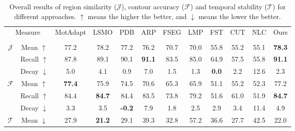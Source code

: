 \documentclass{bmvc2k}
\begin{document}
\begin{table}[!hbp]

\centering
\footnotesize
\begin{tabular}{c|c|cccccccccc}

\hline

\multicolumn{2}{c|}{\multirow{2}{*}{Measure}}    & MotAdapt  & LSMO  & PDB   & ARP  & FSEG   & LMP & FST    & CUT  & NLC & Ours \\
\multicolumn{2}{c|}{}           & \cite{siam2018video}  & \cite{tokmakov2019learning} & \cite{Song_2018_ECCV} & \cite{koh2017primary} & \cite{jain2017fusionseg}  & \cite{tokmakov2016learning}  & \cite{keuper2015motion}   & \cite{faktor2014video}  & \cite{fragkiadaki2012video} & \\ 
\hline
\multirow{3}{*}{$\mathcal{J}$}  
& Mean $\uparrow$               & 77.2  & 78.2  & 77.2  & 76.2	& 70.7	
                                & 70.0	& 55.8	& 55.2	& 55.1  & \textbf{78.3}  \\
& Recall $\uparrow$             & 87.8  & 89.1  & 90.1  & \textbf{91.1}	& 83.5	
                                & 85.0	& 64.9	& 57.5  & 55.8  & \textbf{91.1} \\
& Decay $\downarrow$            & 5.0   & 4.1   & 0.9   & 7.0	& 1.5	
                                & 1.3	& \textbf{0.0}	& 2.2   & 12.6  & 2.3 \\
\hline
\multirow{3}{*}{$\mathcal{F}$}  
& Mean $\uparrow$               & \textbf{77.4}  & 75.9  & 74.5  & 70.6	& 65.3	
                                & 65.9	& 51.1	& 55.2	& 52.3  & 77.2 \\
& Recall $\uparrow$             & 84.4  & \textbf{84.7}  & 84.4  & 83.5  & 73.8	
                                & 79.2	& 51.6	& 61.0	& 51.9  & \textbf{84.7} \\
& Decay $\downarrow$            & 3.3   & 3.5   & \textbf{-0.2}  & 7.9   & 1.8	
                                & 2.5	& 2.9	& 3.4	& 11.4  & 4.9 \\
\hline
$\mathcal{T}$
& Mean $\downarrow$             & 27.9  & \textbf{21.2}  & 29.1  & 39.3	& 32.8	
                                & 57.2	& 36.6	& 27.7	& 42.5  & 22.0\\
\hline
\end{tabular}
\caption{Overall results of region similarity ($\mathcal{J}$), contour accuracy ($\mathcal{F}$) and temporal stability ($\mathcal{T}$) for different approaches. $\uparrow$ means the higher the better, and $\downarrow$ means the lower the better.}
\label{tab:davis_overall}
\end{table}
\end{document}
